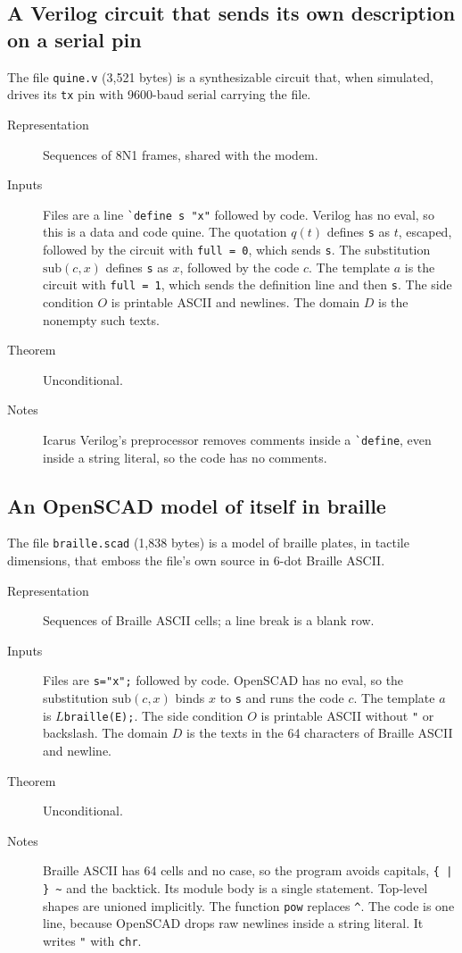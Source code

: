 \documentclass[11pt]{amsart}
\theoremstyle{definition}
\theoremstyle{remark}
\newcommand{\sub}{\mathrm{sub}}
\newcommand{\lean}[1]{\texttt{#1}}
\begin{document}
\subsection{A Verilog circuit that sends its own description on a serial pin}
The file \lean{quine.v} (3,521 bytes) is a synthesizable circuit that, when simulated, drives its
\verb|tx| pin with 9600-baud serial carrying the file.
\begin{description}
\item[Representation] Sequences of 8N1 frames, shared with the modem.
\item[Inputs] Files are a line \verb|`define s "x"| followed by code. Verilog has no eval, so this
is a data and code quine. The quotation $q(t)$ defines \verb|s| as $t$, escaped, followed by the
circuit with \verb|full = 0|, which sends \verb|s|. The substitution $\sub(c,x)$ defines \verb|s| as
$x$, followed by the code $c$. The template $a$ is the circuit with \verb|full = 1|, which sends the
definition line and then \verb|s|. The side condition $O$ is printable ASCII and newlines. The
domain $D$ is the nonempty such texts.
\item[Theorem] Unconditional.
\item[Notes] Icarus Verilog's preprocessor removes comments inside a \verb|`define|, even inside a
string literal, so the code has no comments.
\end{description}

\subsection{An OpenSCAD model of itself in braille}
The file \lean{braille.scad} (1,838 bytes) is a model of braille plates, in tactile dimensions,
that emboss the file's own source in 6-dot Braille ASCII.
\begin{description}
\item[Representation] Sequences of Braille ASCII cells; a line break is a blank row.
\item[Inputs] Files are \verb|s="x";| followed by code. OpenSCAD has no eval, so the substitution
$\sub(c,x)$ binds $x$ to \verb|s| and runs the code $c$. The template $a$ is $L$\verb|braille(E);|.
The side condition $O$ is printable ASCII without \verb|"| or backslash. The domain $D$ is the
texts in the 64 characters of Braille ASCII and newline.
\item[Theorem] Unconditional.
\item[Notes] Braille ASCII has 64 cells and no case, so the program avoids capitals, \verb+{ | } ~+
and the backtick. Its module body is a single statement. Top-level shapes are
unioned implicitly. The function \verb|pow| replaces \verb|^|. The code is one line, because
OpenSCAD drops raw newlines inside a string literal. It writes \verb|"| with \verb|chr|.
\end{description}
\end{document}
